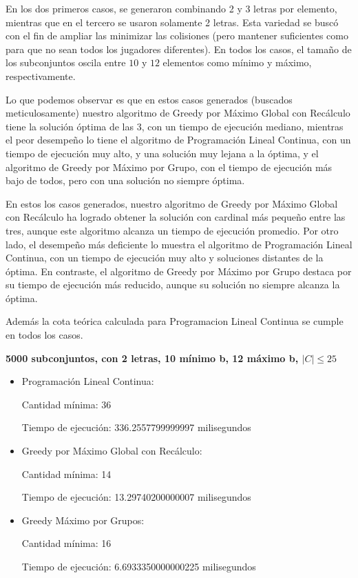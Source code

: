 En los dos primeros casos, se generaron combinando 2 y 3 letras por elemento, mientras que en el tercero se usaron solamente 2 letras. Esta variedad se buscó con el fin de ampliar las minimizar las colisiones (pero mantener suficientes como para que no sean todos los jugadores diferentes). En todos los casos, el tamaño de los subconjuntos oscila entre $10$ y $12$ elementos como mínimo y máximo, respectivamente.


Lo que podemos observar es que en estos casos generados (buscados meticulosamente) nuestro algoritmo de Greedy por Máximo Global con Recálculo tiene la solución óptima de las 3, con un tiempo de ejecución mediano, mientras el peor desempeño lo tiene el algoritmo de Programación Lineal Continua, con un tiempo de ejecución muy alto, y una solución muy lejana a la óptima, y el algoritmo de Greedy por Máximo por Grupo, con el tiempo de ejecución más bajo de todos, pero con una solución no siempre óptima.


En estos los casos generados, nuestro algoritmo de Greedy por Máximo Global con Recálculo ha logrado obtener la solución con cardinal más pequeño entre las tres, aunque este algoritmo alcanza un tiempo de ejecución promedio. 
Por otro lado, el desempeño más deficiente lo muestra el algoritmo de Programación Lineal Continua, con un tiempo de ejecución muy alto y soluciones distantes de la óptima. En contraste, el algoritmo de Greedy por Máximo por Grupo destaca por su tiempo de ejecución más reducido, aunque su solución no siempre alcanza la óptima.

Además la cota teórica calculada para Programacion Lineal Continua se cumple en todos los casos. 


\textbf{5000 subconjuntos, con 2 letras, 10 mínimo b, 12 máximo b, $|C|\leq 25$} 

\begin{itemize}
    \item Programación Lineal Continua:

    Cantidad mínima: 36

    Tiempo de ejecución: 336.2557799999997 milisegundos
    
    \item Greedy por Máximo Global con Recálculo:
    
    Cantidad mínima: 14
    
    Tiempo de ejecución: 13.29740200000007 milisegundos
    
    \item Greedy Máximo por Grupos:
    
    Cantidad mínima: 16
    
    Tiempo de ejecución: 6.6933350000000225 milisegundos
\end{itemize}

